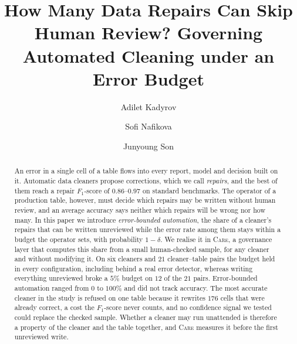 \documentclass[sigconf, nonacm, balance=false]{acmart}
\theoremstyle{remark}
\begin{document}
\setlength{\textfloatsep}{8pt plus 2pt minus 2pt}
\setlength{\dblfloatsep}{6pt plus 2pt minus 2pt}
\setlength{\dbltextfloatsep}{8pt plus 2pt minus 2pt}
\setlength{\intextsep}{6pt plus 2pt minus 2pt}
\setlength{\abovecaptionskip}{5pt}
\setlength{\belowcaptionskip}{0pt}
\renewcommand{\topfraction}{0.92}
\renewcommand{\bottomfraction}{0.75}
\renewcommand{\textfraction}{0.07}
\renewcommand{\floatpagefraction}{0.80}
\renewcommand{\dbltopfraction}{0.92}
\renewcommand{\dblfloatpagefraction}{0.80}

\title{How Many Data Repairs Can Skip Human Review? Governing Automated
Cleaning under an Error Budget}

\author{Adilet Kadyrov}

\author{Sofi Nafikova}

\author{Junyoung Son}

\begin{abstract}
An error in a single cell of a table flows into every report, model and decision built
on it. Automatic data cleaners propose corrections, which we call \emph{repairs}, and
the best of them reach a repair $F_1$-score of $0.86$--$0.97$ on standard benchmarks.
The operator of a production table, however, must decide which repairs may be written
without human review, and an average accuracy says neither which repairs will
be wrong nor how many. In this paper we introduce \emph{error-bounded automation}, the
share of a cleaner's repairs that can be written unreviewed while the error rate among
them stays within a budget the operator sets, with probability $1-\delta$. We realise
it in \textsc{Care}, a governance layer that computes this share from a small
human-checked sample, for any cleaner and without modifying it. On six cleaners and
$21$ cleaner--table pairs the budget held in every configuration, including behind a
real error detector, whereas writing everything unreviewed broke a $5\%$ budget on $12$
of the $21$ pairs. Error-bounded automation ranged from $0$ to $100\%$ and did not
track accuracy. The most accurate cleaner in the study is refused on one table because
it rewrites $176$ cells that were already correct, a cost the $F_1$-score never counts,
and no confidence signal we tested could replace the checked sample. Whether a cleaner
may run unattended is therefore a property of the cleaner and the table together, and
\textsc{Care} measures it before the first unreviewed write.
\end{abstract}
\end{document}
